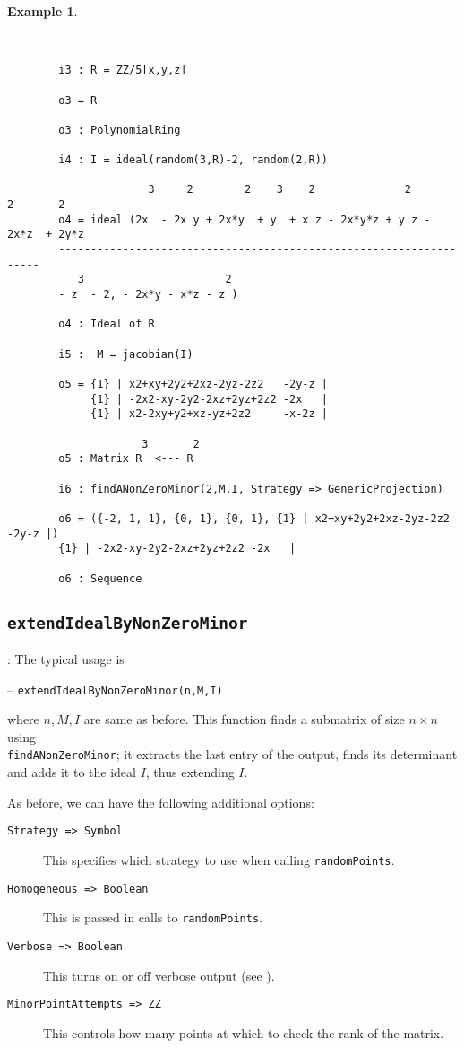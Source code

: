 \documentclass[11pt]{amsart}
\theoremstyle{definition}
\newtheorem{example}{Example}[section]
\begin{document}
\vspace{1em}

\begin{example}~~
	
	~~
	{{\small\color{blue}
		\begin{verbatim}
		i3 : R = ZZ/5[x,y,z]
		
		o3 = R
		
		o3 : PolynomialRing
		
		i4 : I = ideal(random(3,R)-2, random(2,R))
		
		              3     2        2    3    2              2        2       2
		o4 = ideal (2x  - 2x y + 2x*y  + y  + x z - 2x*y*z + y z - 2x*z  + 2y*z 
		-------------------------------------------------------------------
		   3                      2
		- z  - 2, - 2x*y - x*z - z )
		
		o4 : Ideal of R
		
		i5 :  M = jacobian(I)
		
		o5 = {1} | x2+xy+2y2+2xz-2yz-2z2   -2y-z |
		     {1} | -2x2-xy-2y2-2xz+2yz+2z2 -2x   |
		     {1} | x2-2xy+y2+xz-yz+2z2     -x-2z |
		
		             3       2
		o5 : Matrix R  <--- R
		
		i6 : findANonZeroMinor(2,M,I, Strategy => GenericProjection)
		
		o6 = ({-2, 1, 1}, {0, 1}, {0, 1}, {1} | x2+xy+2y2+2xz-2yz-2z2   -2y-z |)
		{1} | -2x2-xy-2y2-2xz+2yz+2z2 -2x   |
		
		o6 : Sequence
		\end{verbatim}
	}}
\end{example}

\subsection{\tt extendIdealByNonZeroMinor}\label{extendIdealByNonZeroMinor}: The typical usage is 

\vspace{1em}
-- {\tt extendIdealByNonZeroMinor(n,M,I)} 

\vspace{1em}
\noindent where $n,M,I$ are same as before. This function finds a submatrix of size $n\times n$ using \\{\tt findANonZeroMinor};  
it extracts the last entry of the output, finds its determinant and
adds it to the ideal $I$, thus extending $I$. 


As before, we can have the following additional options:
\begin{description}
\item[\tt Strategy => Symbol] This specifies which strategy to use when calling {\tt randomPoints}.
\item[\tt Homogeneous => Boolean] This is passed in calls to {\tt randomPoints}.
\item[\tt Verbose => Boolean] This turns on or off verbose output (see ).
\item[\tt MinorPointAttempts => ZZ] This controls how many points at which to check the rank of the matrix.
\end{description}  
\end{document}
